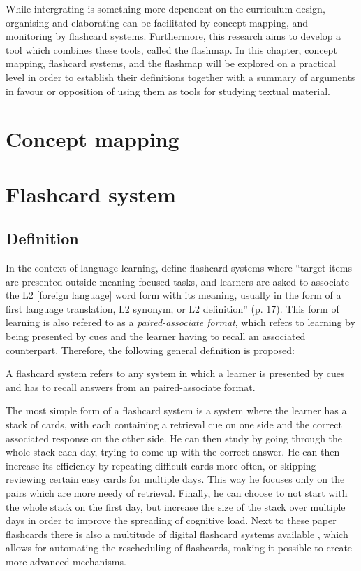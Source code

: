 While intergrating is something more dependent on the curriculum design, organising and elaborating can be facilitated by concept mapping, and monitoring by flashcard systems. Furthermore, this research aims to develop a tool which combines these tools, called the flashmap. In this chapter, concept mapping, flashcard systems, and the flashmap will be explored on a practical level in order to establish their definitions together with a summary of arguments in favour or opposition of using them as tools for studying textual material.

\section{Concept mapping}



\section{Flashcard system}

\subsection{Definition}

In the context of language learning,  define flashcard systems where ``target items are presented outside meaning-focused tasks, and learners are asked to associate the L2 [foreign language] word form with its meaning, usually in the form of a first language translation, L2 synonym, or L2 definition'' (p. 17). This form of learning is also refered to as a \emph{paired-associate format}, which refers to learning by being presented by cues and the learner having to recall an associated counterpart. Therefore, the following general definition is proposed:

\begin{definition}
A flashcard system refers to any system in which a learner is presented by cues and has to recall answers from an paired-associate format.
\end{definition}

The most simple form of a flashcard system is a system where the learner has a stack of cards, with each containing a retrieval cue on one side and the correct associated response on the other side. He can then study by going through the whole stack each day, trying to come up with the correct answer. He can then increase its efficiency by repeating difficult cards more often, or skipping reviewing certain easy cards for multiple days. This way he focuses only on the pairs which are more needy of retrieval. Finally, he can choose to not start with the whole stack on the first day, but increase the size of the stack over multiple days in order to improve the spreading of cognitive load. Next to these paper flashcards there is also a multitude of digital flashcard systems available \cite{hwang2, nakata, microlearning}, which allows for automating the rescheduling of flashcards, making it possible to create more advanced mechanisms.

